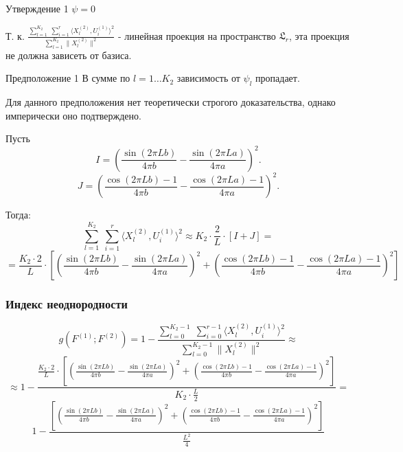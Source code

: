 \documentclass[11pt]{beamer}
\begin{document}
	\begin{frame}
		\begin{block}{Утверждение 1}
			$ \psi = 0 $
		\end{block}
		Т. к. $ \frac{\sum\limits_{l=1}^{K_2}\;\sum\limits_{i=1}^{r}\langle X_l^{(2)}, U_i^{(1)}\rangle^2}{\sum\limits_{l=1}^{K_2}\|X_l^{(2)}\|^2} $ - линейная проекция на пространство $ \mathfrak{L}_r $, эта проекция не должна зависеть от базиса.
		
		\bigskip
		\begin{block}{Предположение 1}
			В сумме по $ l = 1 \dots K_2 $ зависимость от $ \psi_l $ пропадает.
		\end{block}
		Для данного предположения нет теоретически строгого доказательства, однако имперически оно подтверждено.
		
	\end{frame}

	\begin{frame}
		Пусть
		\bigskip
		\small
		$$ I = \left(  \frac{\sin(2\pi Lb)}{4\pi b} - \frac{\sin(2\pi La)}{4\pi a}   \right)^2. $$
		$$ J = \left(  \frac{\cos(2\pi Lb) - 1}{4\pi b} - \frac{\cos(2\pi La) - 1}{4\pi a}  \right)^2. $$
		
		\normalsize 
		Тогда:
		\small
		$$ \sum\limits_{l=1}^{K_2}\;\sum\limits_{i=1}^{r}\langle X_l^{(2)}, U_i^{(1)}\rangle^2 \approx K_2 \cdot \frac{2}{L} \cdot \left [ I + J \right] = $$
		$$ = \frac{K_2 \cdot 2}{L} \cdot \left[ \left(  \frac{\sin(2\pi Lb)}{4\pi b} - \frac{\sin(2\pi La)}{4\pi a}   \right)^2 + \left(  \frac{\cos(2\pi Lb) - 1}{4\pi b} - \frac{\cos(2\pi La) - 1}{4\pi a}  \right)^2 \right] $$
	\end{frame}

	\begin{frame}
		\frametitle{Индекс неоднородности}
		\small
		$$ g(F^{(1)}; F^{(2)}) = 1 - \frac{\sum\limits_{l=0}^{K_2-1}\;\sum\limits_{i=0}^{r-1}\langle X_l^{(2)}, U_i^{(1)}\rangle^2}{\sum\limits_{l=0}^{K_2-1}\|X_l^{(2)}\|^2} \approx $$
		$$ \approx 1 - \frac{\frac{K_2 \cdot 2}{L} \cdot \left[ \left(  \frac{\sin(2\pi Lb)}{4\pi b} - \frac{\sin(2\pi La)}{4\pi a}   \right)^2 + \left(  \frac{\cos(2\pi Lb) - 1}{4\pi b} - \frac{\cos(2\pi La) - 1}{4\pi a}  \right)^2 \right]}{K_2\cdot\frac{L}{2}} = $$
		$$ 1 - \frac{\left[ \left(  \frac{\sin(2\pi Lb)}{4\pi b} - \frac{\sin(2\pi La)}{4\pi a}   \right)^2 + \left(  \frac{\cos(2\pi Lb) - 1}{4\pi b} - \frac{\cos(2\pi La) - 1}{4\pi a}  \right)^2 \right]}{\frac{L^2}{4}}$$
	\end{frame}
\end{document}
